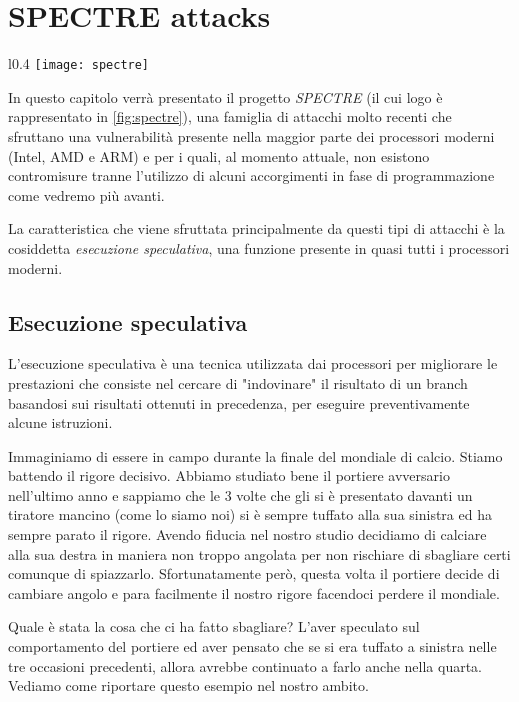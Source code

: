 \chapter{SPECTRE attacks}

	\begin{wrapfigure}{l}{0.4\textwidth}
		\texttt{[image: spectre]}
		\caption{Il logo di SPECTRE}
		\label{fig:spectre}
	\end{wrapfigure}

	In questo capitolo verrà presentato il progetto \emph{SPECTRE}\cite{kocher2018spectre} (il cui logo è rappresentato in \cref{fig:spectre}), una famiglia di attacchi molto recenti che sfruttano una vulnerabilità presente nella maggior parte dei processori moderni (Intel, AMD e ARM) e per i quali, al momento attuale, non esistono contromisure tranne l'utilizzo di alcuni accorgimenti in fase di programmazione come vedremo più avanti.
	
	La caratteristica che viene sfruttata principalmente da questi tipi di attacchi è la cosiddetta \emph{esecuzione speculativa}, una funzione presente in quasi tutti i processori moderni.
	
	\section{Esecuzione speculativa}
		L'esecuzione speculativa è una tecnica utilizzata dai processori per migliorare le prestazioni che consiste nel cercare di "indovinare" il risultato di un branch basandosi sui risultati ottenuti in precedenza, per eseguire preventivamente alcune istruzioni.
		
		Immaginiamo di essere in campo durante la finale del mondiale di calcio. Stiamo battendo il rigore decisivo. Abbiamo studiato bene il portiere avversario nell'ultimo anno e sappiamo che le 3 volte che gli si è presentato davanti un tiratore mancino (come lo siamo noi) si è sempre tuffato alla sua sinistra ed ha sempre parato il rigore. Avendo fiducia nel nostro studio decidiamo di calciare alla sua destra in maniera non troppo angolata per non rischiare di sbagliare certi comunque di spiazzarlo. Sfortunatamente però, questa volta il portiere decide di cambiare angolo e para facilmente il nostro rigore facendoci perdere il mondiale.
		
		Quale è stata la cosa che ci ha fatto sbagliare? L'aver speculato sul comportamento del portiere ed aver pensato che se si era tuffato a sinistra nelle tre occasioni precedenti, allora avrebbe continuato a farlo anche nella quarta. Vediamo come riportare questo esempio nel nostro ambito. 
		
